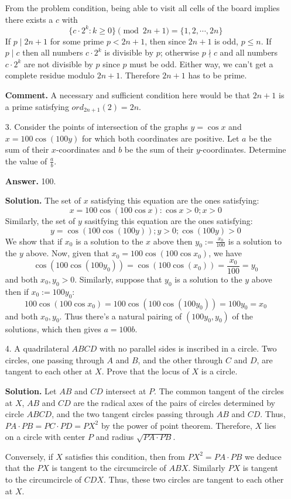 \documentclass[11pt,a4paper]{article}
\begin{document}
\begin{enumerate}
	From the problem condition, being able to visit all cells of the board implies there exists a $c$ with 
	\[
	\{c\cdot 2^k: k\ge 0\}\pmod{2n+1}=\{1, 2, \cdots , 2n\}
	\]
	If $p\mid 2n+1$ for some prime $p<2n+1$, then since $2n+1$ is odd, $p\le n$. If $p\mid c$ then all numbers $c\cdot 2^k$ is divisible by $p$; otherwise $p\nmid c$ and all numbers $c\cdot 2^k$ are not divisible by $p$ since $p$ must be odd. Either way, we can't get a complete residue modulo $2n+1$. Therefore $2n+1$ has to be prime. 
	
	\textbf{Comment.} A necessary and sufficient condition here would be that $2n+1$ is a prime satisfying $ord_{2n+1}(2)=2n$. 
	
	\item[3.] Consider the points of intersection of the graphs $y = \cos x$ and $x = 100 \cos (100y)$ for which both coordinates are positive. Let $a$ be the sum of their $x$-coordinates and $b$ be the sum of their $y$-coordinates. Determine the value of $\frac{a}{b}$.
	
	\textbf{Answer.} 100. 
	
	\textbf{Solution.} The set of $x$ satisfying this equation are the ones satisfying: 
	\[
	x=100\cos(100\cos x): \cos x > 0; x > 0
	\]
	Similarly, the set of $y$ sasitfying this equation are the ones satisfying: 
	\[
	y = \cos (100\cos(100 y)); y > 0; \cos (100 y) > 0
	\]
	We show that if $x_0$ is a solution to the $x$ above then $y_0:=\frac{x_0}{100}$ is a solution to the $y$ above. 
	Now, given that $x_0=100\cos(100\cos x_0)$, we have 
	\[
	\cos (100\cos(100 y_0)) = \cos (100\cos(x_0))= \frac{x_0}{100} = y_0
	\]
	and both $x_0, y_0 > 0$. Similarly, suppose that $y_0$ is a solution to the $y$ above then if $x_0:=100y_0$: 
	\[
	100\cos(100\cos x_0) = 100\cos(100\cos (100y_0)) = 100 y_0 = x_0
	\]
	and both $x_0, y_0$. Thus there's a natural pairing of $(100y_0, y_0)$ of the solutions, which then gives $a=100b$. 
	
	\item[4.] A quadrilateral $ABCD$ with no parallel sides is inscribed in a circle. Two circles, one passing through $A$ and $B$, and the other through $C$ and $D$, are tangent to each other at $X$. Prove that the locus of $X$ is a circle.
	
	\textbf{Solution.} Let $AB$ and $CD$ intersect at $P$. The common tangent of the circles at $X$, $AB$ and $CD$ are the radical axes of the pairs of circles determined by circle $ABCD$, and the two tangent circles passing through $AB$ and $CD$. Thus, $PA\cdot PB = PC\cdot PD = PX^2$ by the power of point theorem. Therefore, $X$ lies on a circle with center $P$ and radius $\sqrt{PA\cdot PB}$. 
	
	Conversely, if $X$ satisfies this condition, then from $PX^2=PA\cdot PB$ we deduce that the $PX$ is tangent to the circumcircle of $ABX$. Similarly $PX$ is tangent to the circumcircle of $CDX$. Thus, these two circles are tangent to each other at $X$. 
\end{enumerate}
\end{document}
